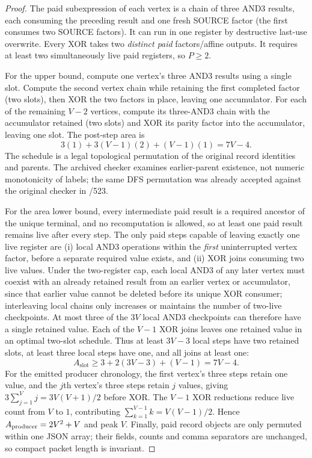 \documentclass[11pt]{article}
\begin{document}
\begin{proof}
The paid subexpression of each vertex is a chain of three AND3 results, each consuming the preceding result and one fresh SOURCE factor (the first consumes two SOURCE factors). It can run in one register by destructive last-use overwrite. Every XOR takes two \emph{distinct paid} factors/affine outputs. It requires at least two simultaneously live paid registers, so $P\ge2$.

For the upper bound, compute one vertex's three AND3 results using a single slot. Compute the second vertex chain while retaining the first completed factor (two slots), then XOR the two factors in place, leaving one accumulator. For each of the remaining $V-2$ vertices, compute its three-AND3 chain with the accumulator retained (two slots) and XOR its parity factor into the accumulator, leaving one slot. The post-step area is
\[
3(1)+3(V-1)(2)+(V-1)(1)=7V-4.
\]
The schedule is a legal topological permutation of the original record identities and parents. The archived checker examines earlier-parent existence, not numeric monotonicity of labels; the same DFS permutation was already accepted against the original checker in /523.

For the area lower bound, every intermediate paid result is a required ancestor of the unique terminal, and no recomputation is allowed, so at least one paid result remains live after every step. The only paid steps capable of leaving exactly one live register are (i) local AND3 operations within the \emph{first} uninterrupted vertex factor, before a separate required value exists, and (ii) XOR joins consuming two live values. Under the two-register cap, each local AND3 of any later vertex must coexist with an already retained result from an earlier vertex or accumulator, since that earlier value cannot be deleted before its unique XOR consumer; interleaving local chains only increases or maintains the number of two-live checkpoints. At most three of the $3V$ local AND3 checkpoints can therefore have a single retained value. Each of the $V-1$ XOR joins leaves one retained value in an optimal two-slot schedule. Thus at least $3V-3$ local steps have two retained slots, at least three local steps have one, and all joins at least one:
\[
A_{\mathrm{slot}}\ge3+2(3V-3)+(V-1)=7V-4.
\]
For the emitted producer chronology, the first vertex's three steps retain one value, and the $j$th vertex's three steps retain $j$ values, giving $3\sum_{j=1}^V j=3V(V+1)/2$ before XOR. The $V-1$ XOR reductions reduce live count from $V$ to $1$, contributing $\sum_{k=1}^{V-1}k=V(V-1)/2$. Hence $A_{\rm producer}=2V^2+V$ and peak $V$. Finally, paid record objects are only permuted within one JSON array; their fields, counts and comma separators are unchanged, so compact packet length is invariant. \qedhere
\end{proof}
\end{document}
